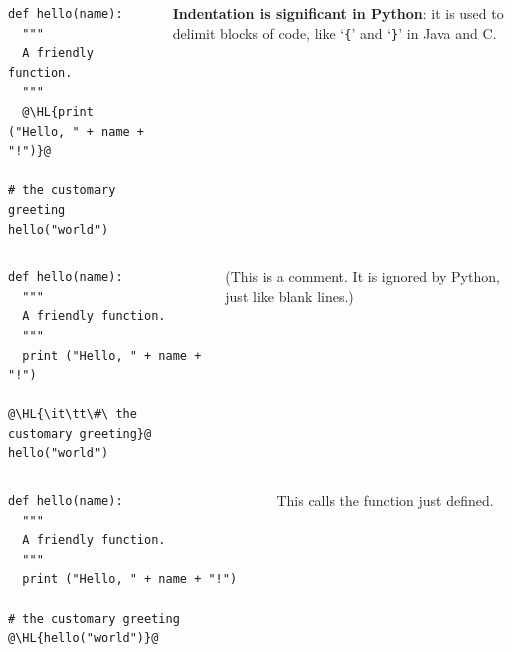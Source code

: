 \documentclass[english,serif,mathserif,xcolor=pdftex,dvipsnames,table]{beamer}
\begin{document}
\begin{frame}[fragile]
  \begin{columns}[t]
    \begin{column}{0.5\textwidth}
\begin{lstlisting}
def hello(name):
  """
  A friendly function.
  """
  @\HL{print ("Hello, " + name + "!")}@

# the customary greeting
hello("world")
\end{lstlisting}
    \end{column}
    \begin{column}{0.5\textwidth}
      \raggedleft
      \textbf{Indentation is significant in Python}: it is used to delimit
      blocks of code, like `\texttt{\{}' and `\texttt{\}}' in Java and C.
    \end{column}
  \end{columns}
\end{frame}

\begin{frame}[fragile]
  \begin{columns}[t]
    \begin{column}{0.5\textwidth}
\begin{lstlisting}
def hello(name):
  """
  A friendly function.
  """
  print ("Hello, " + name + "!")

@\HL{\it\tt\#\ the customary greeting}@
hello("world")
\end{lstlisting}
    \end{column}
    \begin{column}{0.5\textwidth}
      \raggedleft
      (This is a comment. It is ignored by Python, just like blank lines.)
    \end{column}
  \end{columns}
\end{frame}

\begin{frame}[fragile]
  \begin{columns}[t]
    \begin{column}{0.5\textwidth}
\begin{lstlisting}
def hello(name):
  """
  A friendly function.
  """
  print ("Hello, " + name + "!")

# the customary greeting
@\HL{hello("world")}@
\end{lstlisting}
    \end{column}
    \begin{column}{0.5\textwidth}
      \raggedleft
      This calls the function just defined.
    \end{column}
  \end{columns}
\end{frame}
\end{document}
